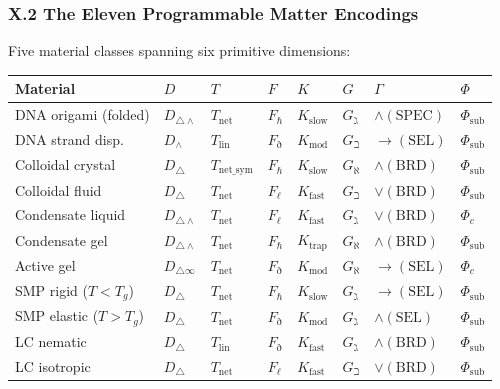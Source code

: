 \documentclass[12pt,a4paper]{article}
\begin{document}
\subsubsection{X.2 The Eleven Programmable Matter Encodings}

Five material classes spanning six primitive dimensions:

\begin{table}[htbp]
\centering
\small
{}
\begin{tabularx}{\textwidth}{>{\centering\arraybackslash}X >{\centering\arraybackslash}X >{\centering\arraybackslash}X >{\centering\arraybackslash}X >{\centering\arraybackslash}X >{\centering\arraybackslash}X >{\centering\arraybackslash}X >{\centering\arraybackslash}X}
\toprule
\rowcolor{gray!25}\textbf{Material} & \textbf{$D$} & \textbf{$T$} & \textbf{$F$} & \textbf{$K$} & \textbf{$G$} & \textbf{$\Gamma$} & \textbf{$\Phi$} \\
\midrule
\rowcolors{1}{white}{gray!10}
DNA origami (folded) & $D_{\triangle\wedge}$ & $T_\text{net}$ & $F_\hbar$ & $K_\text{slow}$ & $G_\gimel$ & $\wedge(\text{SPEC})$ & $\Phi_\text{sub}$ \\
DNA strand disp. & $D_\wedge$ & $T_\text{lin}$ & $F_\eth$ & $K_\text{mod}$ & $G_\beth$ & $\to(\text{SEL})$ & $\Phi_\text{sub}$ \\
Colloidal crystal & $D_\triangle$ & $T_{\text{net\_sym}}$ & $F_\hbar$ & $K_\text{slow}$ & $G_\aleph$ & $\wedge(\text{BRD})$ & $\Phi_\text{sub}$ \\
Colloidal fluid & $D_\triangle$ & $T_\text{net}$ & $F_\ell$ & $K_\text{fast}$ & $G_\beth$ & $\vee(\text{BRD})$ & $\Phi_\text{sub}$ \\
Condensate liquid & $D_{\triangle\wedge}$ & $T_\text{net}$ & $F_\ell$ & $K_\text{fast}$ & $G_\gimel$ & $\vee(\text{BRD})$ & $\Phi_c$ \\
Condensate gel & $D_{\triangle\wedge}$ & $T_\text{net}$ & $F_\hbar$ & $K_\text{trap}$ & $G_\aleph$ & $\wedge(\text{BRD})$ & $\Phi_\text{sub}$ \\
Active gel & $D_{\triangle\infty}$ & $T_\text{net}$ & $F_\eth$ & $K_\text{mod}$ & $G_\aleph$ & $\to(\text{SEL})$ & $\Phi_c$ \\
SMP rigid ($T < T_g$) & $D_\triangle$ & $T_\text{net}$ & $F_\hbar$ & $K_\text{slow}$ & $G_\gimel$ & $\to(\text{SEL})$ & $\Phi_\text{sub}$ \\
SMP elastic ($T > T_g$) & $D_\triangle$ & $T_\text{net}$ & $F_\eth$ & $K_\text{mod}$ & $G_\gimel$ & $\wedge(\text{SEL})$ & $\Phi_\text{sub}$ \\
LC nematic & $D_\triangle$ & $T_\text{lin}$ & $F_\eth$ & $K_\text{fast}$ & $G_\gimel$ & $\wedge(\text{BRD})$ & $\Phi_\text{sub}$ \\
LC isotropic & $D_\triangle$ & $T_\text{net}$ & $F_\ell$ & $K_\text{fast}$ & $G_\beth$ & $\vee(\text{BRD})$ & $\Phi_\text{sub}$ \\
\bottomrule
\end{tabularx}
\end{table}
\end{document}
